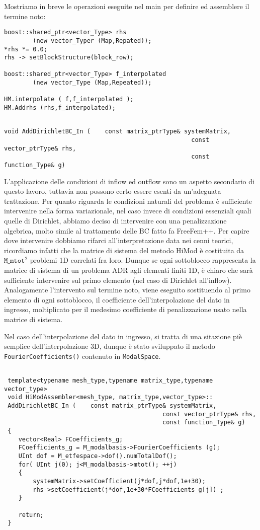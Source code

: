 Mostriamo in breve le operazioni eseguite nel main per definire ed assemblere il termine noto:
\begin{lstlisting}[style = general]
boost::shared_ptr<vector_Type> rhs 
		(new vector_Typer (Map,Repated));
*rhs *= 0.0;
rhs -> setBlockStructure(block_row);

boost::shared_ptr<vector_Type> f_interpolated 
		(new vector_Type (Map,Repeated));

HM.interpolate ( f,f_interpolated );
HM.Addrhs (rhs,f_interpolated);
\end{lstlisting}

\begin{lstlisting}[style = general,frame = top]

void AddDirichletBC_In (	const matrix_ptrType& systemMatrix,
													const vector_ptrType& rhs,
													const function_Type& g)
\end{lstlisting}

L'applicazione delle condizioni di inflow ed outflow sono un aspetto secondario di questo lavoro, tuttavia non possono certo essere esenti da un'adeguata trattazione. Per quanto riguarda le condizioni naturali del problema \`e sufficiente intervenire nella forma variazionale, nel caso invece di condizioni essenziali quali quelle di Dirichlet, abbiamo deciso di intervenire con una penalizzazione algebrica, molto simile al trattamento delle BC fatto fa FreeFem++. Per capire dove intervenire dobbiamo rifarci all'interpretazione data nei cenni teorici, ricordiamo infatti che la matrice di sistema del metodo HiMod \`e costituita da $\texttt{M\_mtot}^2$ problemi 1D correlati fra loro. Dunque se ogni sottoblocco rappresenta la matrice di sistema di un problema ADR agli elementi finiti 1D, \`e chiaro che sar\`a sufficiente intervenire sul primo elemento (nel caso di Dirichlet all'inflow). Analogamente l'intervento sul termine noto, viene eseguito sostituendo al primo elemento di ogni sottoblocco, il coefficiente dell'interpolazione del dato in ingresso, moltiplicato per il medesimo coefficiente di penalizzazione usato nella matrice di sistema.

Nel caso dell'interpolazione del dato in ingresso, si tratta di una sitazione pi\`e semplice dell'interpolazione 3D, dunque \`e stato sviluppato il metodo \texttt{FourierCoefficients()} contenuto in \texttt{ModalSpace}.
\begin{lstlisting}[style = general]

 template<typename mesh_type,typename matrix_type,typename vector_type>
 void HiModAssembler<mesh_type, matrix_type,vector_type>::
 AddDirichletBC_In (	const matrix_ptrType& systemMatrix,
 											const vector_ptrType& rhs,
 											const function_Type& g)
 {
 	vector<Real> FCoefficients_g;
 	FCoefficients_g = M_modalbasis->FourierCoefficients (g);
 	UInt dof = M_etfespace->dof().numTotalDof();
 	for( UInt j(0); j<M_modalbasis->mtot(); ++j)
 	{
		systemMatrix->setCoefficient(j*dof,j*dof,1e+30);
		rhs->setCoefficient(j*dof,1e+30*FCoefficients_g[j]) ;
 	}
 	
 	return;
 }
\end{lstlisting}

